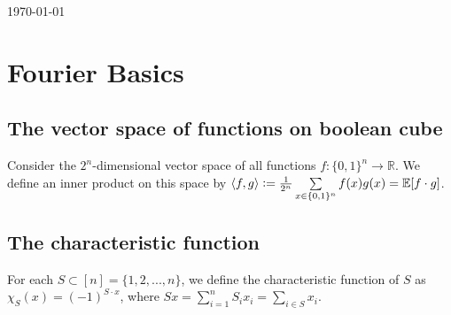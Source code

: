 \begin{titlepage}

{\large \today}\\[3cm] %


 

\vfill %

\end{titlepage}

\chapter{Fourier Basics}
\section{The vector space of functions on boolean cube}
\begin{definition}
Consider the $2^n$-dimensional vector space of all functions 
$f : \{ 0,1 \}^n \rightarrow\mathbb{R}$. 
We define an inner product on this space by \center
$\langle f, g \rangle \vcentcolon= \frac{1}{2^n}\sum\limits_{x  \in \{ 0,1 \}^n} f(x)g(x) = \mathbb{E}[f \cdot g]$. \\
\end{definition}
\section{The characteristic function}
\begin{definition} 
For each $S \subset [n] = \{1,2,..., n\}$, we define the characteristic function  of $S$ as \center 
${\chi}_S(x) = (-1)^{S \cdot x}$, where $Sx = \sum\limits_{i=1}^{n} S_i x_i = \sum \limits_{i \in S} x_i$.
\end{definition}

